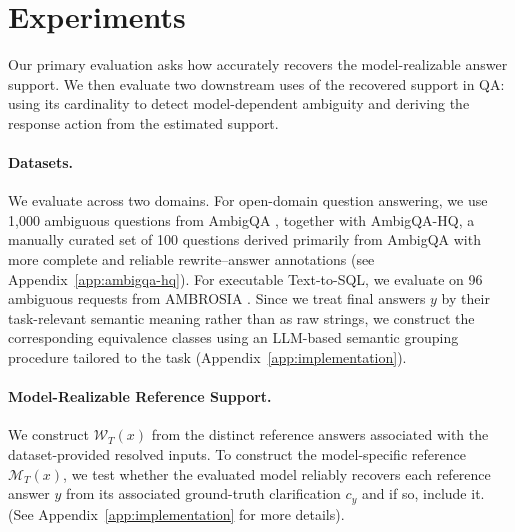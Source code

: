 \section{Experiments}
\label{sec:evaluation}

Our primary evaluation asks how accurately \circleclar{} recovers the model-realizable answer support.
We then evaluate two downstream uses of the recovered support in QA: using its cardinality to detect model-dependent ambiguity and deriving the response action from the estimated support.

\paragraph{Datasets.}
We evaluate \circleclar{} across two domains. For open-domain question answering, we use 1{,}000 ambiguous questions from AmbigQA \citep{min-etal-2020-ambigqa}, together with AmbigQA-HQ, a manually curated set of 100 questions derived primarily from AmbigQA with more complete and reliable rewrite--answer annotations (see Appendix~\ref{app:ambigqa-hq}). For executable Text-to-SQL, we evaluate on 96 ambiguous requests from AMBROSIA \citep{NEURIPS2024_a4c942a8}. Since we treat final answers \(y\) by their task-relevant semantic meaning rather than as raw strings, we construct the corresponding equivalence classes using an LLM-based semantic grouping procedure tailored to the task (Appendix~\ref{app:implementation}).



\paragraph{Model-Realizable Reference Support.}
We construct $\mathcal{W}_T(x)$ from the distinct reference answers associated with the dataset-provided resolved inputs. To construct the model-specific reference $\mathcal{M}_T(x)$, we test whether the evaluated model reliably recovers each reference answer $y$ from its associated ground-truth clarification $c_y$ and if so, include it. (See Appendix~\ref{app:implementation} for more details).





